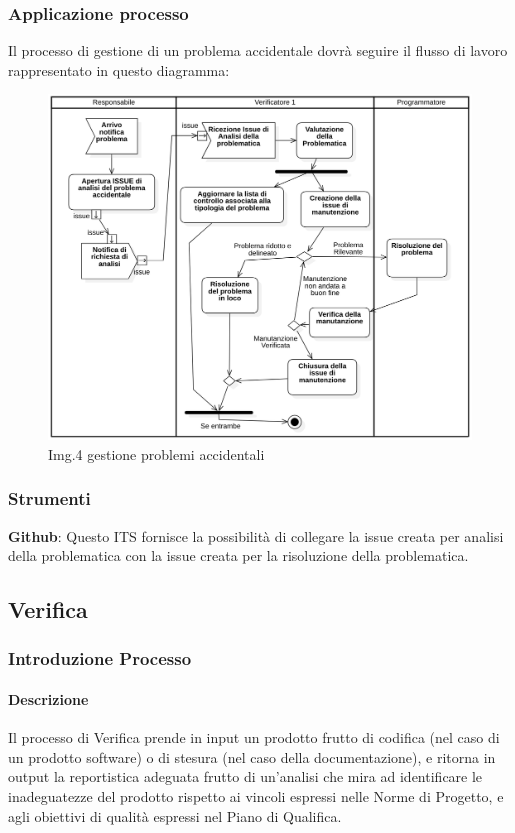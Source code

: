 		\subsubsection{Applicazione processo}
			Il processo di gestione di un problema accidentale dovrà seguire il flusso di lavoro rappresentato in questo diagramma:
			\begin{figure}[H]
    				\centering
    				\includegraphics[width=1.0\textwidth]{res/images/gestione_problemi_accidentali.png}
				\caption{Img.4 gestione problemi accidentali}
				\label{fig:Img.4 gestione problemi accidentali}
			\end{figure}
		\subsubsection{Strumenti}
			\textbf{Github}: Questo ITS fornisce la possibilità di collegare la issue creata per analisi della problematica con la issue creata per la risoluzione della problematica.

	\subsection{Verifica}
		\subsubsection{Introduzione Processo}
			\paragraph{Descrizione}
				Il processo di Verifica prende in input un prodotto frutto di codifica (nel caso di un prodotto software) o di stesura (nel caso della documentazione), e ritorna in output la reportistica adeguata frutto di un’analisi che mira ad identificare le inadeguatezze del prodotto rispetto ai vincoli espressi nelle Norme di Progetto, e agli obiettivi di qualità espressi nel Piano di Qualifica. 
